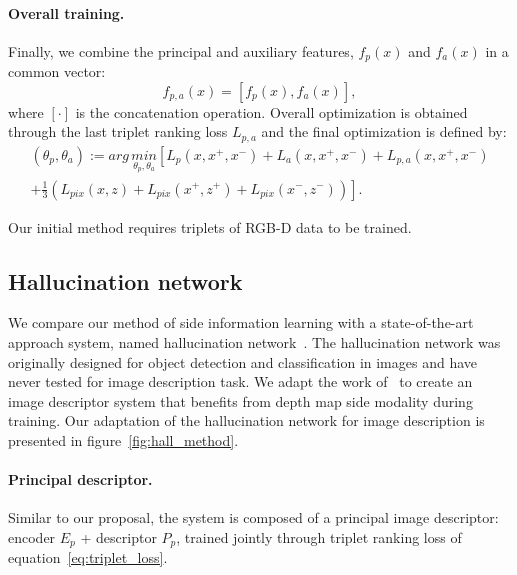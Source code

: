 \paragraph{Overall training.}
Finally, we combine the principal and auxiliary features, $f_p(x)$ and $f_a(x)$ in a common vector:
\begin{equation}
	\label{eq:concat_desc}
	f_{p,a}(x) = \left[ f_p(x), f_a(x)  \right],
\end{equation}
where $[ \cdot ]$ is the concatenation operation. Overall optimization is obtained through the last triplet ranking loss $L_{p,a}$ and the final optimization is defined by:
\begin{multline}
	\label{eq:overall_loss}
	\left( \theta_{p}, \theta_{a} \right) := arg\,\underset{\theta_p, \theta_a}{min} \left[ L_p(x, x^+, x^-) + L_a(x, x^+, x^-) + L_{p,a}(x, x^+, x^-) \right. \\
	\left. + \frac{1}{3}\left( L_{pix}(x, z) + L_{pix}(x^+, z^+) + L_{pix}(x^-, z^-) \right) \right].
\end{multline}

Our initial method requires triplets of RGB-D data to be trained.

\subsection{Hallucination network}


We compare our method of side information learning with a state-of-the-art approach system, named hallucination network~\citep{Hoffman2016}. The hallucination network was originally designed for object detection and classification in images and have never tested for image description task. We adapt the work of~\citet{Hoffman2016} to create an image descriptor system that benefits from depth map side modality during training. Our adaptation of the hallucination network for image description is presented in figure~\ref{fig:hall_method}.

\paragraph{Principal descriptor.}
Similar to our proposal, the system is composed of a principal image descriptor: encoder $E_p$ + descriptor $P_p$, trained jointly through triplet ranking loss of equation~\ref{eq:triplet_loss}.

